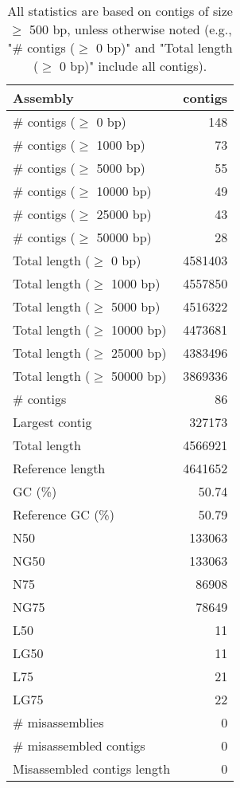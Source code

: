 \documentclass[12pt,a4paper]{article}
\begin{document}
\begin{table}[ht]
\begin{center}
\caption{All statistics are based on contigs of size $\geq$ 500 bp, unless otherwise noted (e.g., "\# contigs ($\geq$ 0 bp)" and "Total length ($\geq$ 0 bp)" include all contigs).}
\begin{tabular}{|l*{1}{|r}|}
\hline
Assembly & contigs \\ \hline
\# contigs ($\geq$ 0 bp) & 148 \\ \hline
\# contigs ($\geq$ 1000 bp) & 73 \\ \hline
\# contigs ($\geq$ 5000 bp) & 55 \\ \hline
\# contigs ($\geq$ 10000 bp) & 49 \\ \hline
\# contigs ($\geq$ 25000 bp) & 43 \\ \hline
\# contigs ($\geq$ 50000 bp) & 28 \\ \hline
Total length ($\geq$ 0 bp) & 4581403 \\ \hline
Total length ($\geq$ 1000 bp) & 4557850 \\ \hline
Total length ($\geq$ 5000 bp) & 4516322 \\ \hline
Total length ($\geq$ 10000 bp) & 4473681 \\ \hline
Total length ($\geq$ 25000 bp) & 4383496 \\ \hline
Total length ($\geq$ 50000 bp) & 3869336 \\ \hline
\# contigs & 86 \\ \hline
Largest contig & 327173 \\ \hline
Total length & 4566921 \\ \hline
Reference length & 4641652 \\ \hline
GC (\%) & 50.74 \\ \hline
Reference GC (\%) & 50.79 \\ \hline
N50 & 133063 \\ \hline
NG50 & 133063 \\ \hline
N75 & 86908 \\ \hline
NG75 & 78649 \\ \hline
L50 & 11 \\ \hline
LG50 & 11 \\ \hline
L75 & 21 \\ \hline
LG75 & 22 \\ \hline
\# misassemblies & 0 \\ \hline
\# misassembled contigs & 0 \\ \hline
Misassembled contigs length & 0 \\ \hline

\end{tabular}
\end{center}
\end{table}
\end{document}
